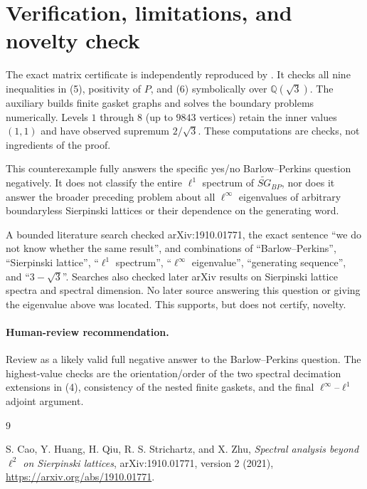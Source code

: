 \documentclass[11pt]{article}
\newcommand{\SG}{\widetilde{SG}}
\begin{document}
\section{Verification, limitations, and novelty check}

The exact matrix certificate is independently reproduced by
. It checks all nine inequalities
in (5), positivity of $P$, and (6) symbolically over
$\mathbb Q(\sqrt3)$. The auxiliary
 builds finite gasket graphs and solves
the boundary problems numerically. Levels $1$ through $8$ (up to $9843$
vertices) retain the inner values $(1,1)$ and have observed supremum
$2/\sqrt3$. These computations are checks, not ingredients of the proof.

This counterexample fully answers the specific yes/no Barlow--Perkins
question negatively. It does not classify the entire $\ell^1$ spectrum of
$\SG_{BP}$, nor does it answer the broader preceding problem about all
$\ell^\infty$ eigenvalues of arbitrary boundaryless Sierpinski lattices or
their dependence on the generating word.

A bounded literature search checked arXiv:1910.01771, the exact sentence
``we do not know whether the same result'', and combinations of
``Barlow--Perkins'', ``Sierpinski lattice'', ``$\ell^1$ spectrum'',
``$\ell^\infty$ eigenvalue'', ``generating sequence'', and
``$3-\sqrt3$''. Searches also checked later arXiv results on Sierpinski
lattice spectra and spectral dimension. No later source answering this
question or giving the eigenvalue above was located. This supports, but does
not certify, novelty.

\paragraph{Human-review recommendation.}
Review as a likely valid full negative answer to the Barlow--Perkins question.
The highest-value checks are the orientation/order of the two spectral
decimation extensions in (4), consistency of the nested finite gaskets, and
the final $\ell^\infty$--$\ell^1$ adjoint argument.

\begin{thebibliography}{9}

S. Cao, Y. Huang, H. Qiu, R. S. Strichartz, and X. Zhu,
\emph{Spectral analysis beyond $\ell^2$ on Sierpinski lattices},
arXiv:1910.01771, version 2 (2021),
\url{https://arxiv.org/abs/1910.01771}.

\end{thebibliography}
\end{document}
